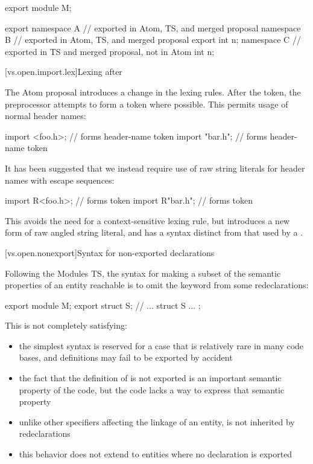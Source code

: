 \pnum
\begin{example}
\begin{codeblock}
export module M;

export namespace A {} // exported in Atom, TS, and merged proposal
namespace B {         // exported in Atom, TS, and merged proposal
  export int n;
}
namespace C {         // exported in TS and merged proposal, not in Atom
  int n;
}
\end{codeblock}
\end{example}

[vs.open.import.lex]{Lexing after }

\pnum
The Atom proposal introduces a change in the \Cpp{} lexing rules.
After the  token,
the preprocessor attempts to form a 
token where possible.
This permits usage of normal header names:

\begin{codeblock}
import <foo.h>;       // forms  header-name token
import "bar\baz.h";   // forms  header-name token
\end{codeblock}

\pnum
It has been suggested that we instead require use of
raw string literals for header names with escape sequences:

\begin{codeblock}
import R<foo.h>;       // forms  token
import R"bar\baz.h";   // forms  token
\end{codeblock}

This avoids the need for a context-sensitive lexing rule,
but introduces a new form of raw angled string literal,
and has a  syntax distinct from
that used by a .

[vs.open.nonexport]{Syntax for non-exported declarations}

\pnum
Following the Modules TS,
the syntax for making a subset
of the semantic properties of an entity reachable
is to omit the  keyword
from some redeclarations:

\begin{codeblock}
export module M;
export struct S;
// ...
struct S { ... };
\end{codeblock}

\pnum
This is not completely satisfying:
\begin{itemize}
\item the simplest syntax is reserved for a case that is
relatively rare in many code bases, and definitions may
fail to be exported by accident
\item the fact that the definition of  is not exported
is an important semantic property of the code,
but the code lacks a way to express that semantic property
\item unlike other specifiers affecting the linkage
of an entity,  is not inherited by redeclarations
\item this behavior does not extend to entities where
no declaration is exported
\end{itemize}

